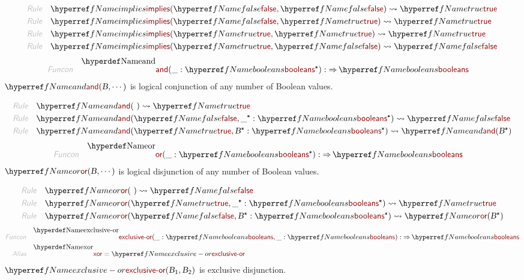 \begin{align*}
  \KEY{Rule} \quad
    & \NAMEREF{implies}
        (  \NAMEREF{false}, 
               \NAMEREF{false} ) \leadsto 
        \NAMEREF{true}
\\
  \KEY{Rule} \quad
    & \NAMEREF{implies}
        (  \NAMEREF{false}, 
               \NAMEREF{true} ) \leadsto 
        \NAMEREF{true}
\\
  \KEY{Rule} \quad
    & \NAMEREF{implies}
        (  \NAMEREF{true}, 
               \NAMEREF{true} ) \leadsto 
        \NAMEREF{true}
\\
  \KEY{Rule} \quad
    & \NAMEREF{implies}
        (  \NAMEREF{true}, 
               \NAMEREF{false} ) \leadsto 
        \NAMEREF{false}
\end{align*}
\begin{align*}
  \KEY{Funcon} \quad
  & \NAMEDECL{and}(
                       \_ : \NAMEREF{booleans}\STAR) 
    :  \TO \NAMEREF{booleans} 
\end{align*}
$\SHADE{\NAMEREF{and}
           (  \VAR{B}, 
                  \cdots )}$ is logical conjunction of any number of Boolean values.

\begin{align*}
  \KEY{Rule} \quad
    & \NAMEREF{and}
        (   \  ) \leadsto 
        \NAMEREF{true}
\\
  \KEY{Rule} \quad
    & \NAMEREF{and}
        (  \NAMEREF{false}, 
               \_\STAR : \NAMEREF{booleans}\STAR ) \leadsto 
        \NAMEREF{false}
\\
  \KEY{Rule} \quad
    & \NAMEREF{and}
        (  \NAMEREF{true}, 
               \VAR{B}\STAR : \NAMEREF{booleans}\STAR ) \leadsto 
        \NAMEREF{and}
          (  \VAR{B}\STAR )
\end{align*}
\begin{align*}
  \KEY{Funcon} \quad
  & \NAMEDECL{or}(
                       \_ : \NAMEREF{booleans}\STAR) 
    :  \TO \NAMEREF{booleans} 
\end{align*}
$\SHADE{\NAMEREF{or}
           (  \VAR{B}, 
                  \cdots )}$ is logical disjunction of any number of Boolean values.

\begin{align*}
  \KEY{Rule} \quad
    & \NAMEREF{or}
        (   \  ) \leadsto 
        \NAMEREF{false}
\\
  \KEY{Rule} \quad
    & \NAMEREF{or}
        (  \NAMEREF{true}, 
               \_\STAR : \NAMEREF{booleans}\STAR ) \leadsto 
        \NAMEREF{true}
\\
  \KEY{Rule} \quad
    & \NAMEREF{or}
        (  \NAMEREF{false}, 
               \VAR{B}\STAR : \NAMEREF{booleans}\STAR ) \leadsto 
        \NAMEREF{or}
          (  \VAR{B}\STAR )
\end{align*}
\begin{align*}
  \KEY{Funcon} \quad
  & \NAMEDECL{exclusive-or}(
                       \_ : \NAMEREF{booleans}, \_ : \NAMEREF{booleans}) 
    :  \TO \NAMEREF{booleans} 
\\
  \KEY{Alias} \quad
  & \NAMEDECL{xor} = \NAMEREF{exclusive-or}
\end{align*}
$\SHADE{\NAMEREF{exclusive-or}
           (  \VAR{B}\SUB{1}, 
                  \VAR{B}\SUB{2} )}$ is exclusive disjunction.

